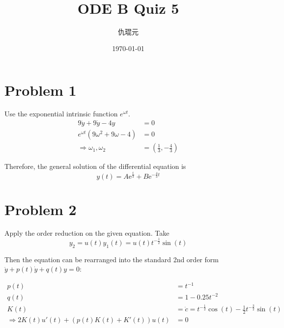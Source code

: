 \documentclass[utf8]{ctexart}
\begin{document}
\title{ODE B Quiz 5}
\author{仇琨元}
\date{\today}
\maketitle

\section{Problem 1}

Use the exponential intrinsic function \(e^{\omega t}\).
\begin{equation}
	\begin{aligned}
		9\ddot{y} +9\dot{y}-4y              & =0                                     \\
		e^{\omega t}(9\omega^{2}+9\omega-4) & =0                                     \\
		\Rightarrow \omega_1,\omega_2       & =\left(\frac{1}{3},-\frac{4}{3}\right)
	\end{aligned}
	\label{eq1-prob1}
\end{equation}

Therefore, the general solution of the differential equation is
\begin{equation}
	y(t)=A \mathrm{e}^{\frac{t}{3}}+B \mathrm{e}^{-\frac{4}{3}t}
	\label{eq2-prob1}
\end{equation}

\section{Problem 2}

Apply the order reduction on the given equation. Take
\begin{equation}
	y_2=u(t)y_1 (t)=u(t)t^{-\frac{1}{2}}\sin (t)
	\label{eq1-prob2}
\end{equation}

Then the equation can be rearranged into the standard 2nd order form \(\ddot{y}+p(t)\dot{y}+q(t)y=0\):

\begin{equation}
	\begin{aligned}
		p(t)                                        & =t^{-1}                                                               \\
		q(t)                                        & =1-0.25t^{-2}                                                         \\
		K(t)                                        & =\dot{c}=t^{-\frac{1}{2}}\cos (t)-\frac{1}{2}t^{-\frac{3}{2}}\sin (t) \\
		\Rightarrow 2K(t)u'(t)+(p(t)K(t)+K'(t))u(t) & =0
	\end{aligned}
	\label{eq2-prob2}
\end{equation}
\end{document}
